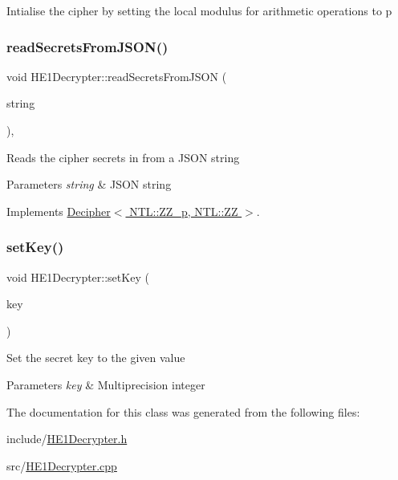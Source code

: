 Intialise the cipher by setting the local modulus for arithmetic operations to {\ttfamily p} \mbox{\label{classHE1Decrypter_af60ccc6d0afe7555a9d1468ad7047733}} 
\subsubsection{\texorpdfstring{read\+Secrets\+From\+J\+S\+O\+N()}{readSecretsFromJSON()}}
{\footnotesize\ttfamily void H\+E1\+Decrypter\+::read\+Secrets\+From\+J\+S\+ON (\begin{DoxyParamCaption}\item[{std\+::string \&}]{string }\end{DoxyParamCaption})\hspace{0.3cm}{\ttfamily [override]}, {\ttfamily [virtual]}}

Reads the cipher secrets in from a J\+S\+ON string 
\begin{DoxyParams}{Parameters}
{\em string} & J\+S\+ON string \\
\hline
\end{DoxyParams}


Implements \hyperlink{classDecipher_a39aea002012130201e12a8fa7d84dda5}{Decipher$<$ N\+T\+L\+::\+Z\+Z\+\_\+p, N\+T\+L\+::\+Z\+Z $>$}.

\mbox{\label{classHE1Decrypter_a7b06b69bcd5ef096067232f819321482}} 
\subsubsection{\texorpdfstring{set\+Key()}{setKey()}}
{\footnotesize\ttfamily void H\+E1\+Decrypter\+::set\+Key (\begin{DoxyParamCaption}\item[{N\+T\+L\+::\+ZZ \&}]{key }\end{DoxyParamCaption})}

Set the secret key to the given value 
\begin{DoxyParams}{Parameters}
{\em key} & Multiprecision integer \\
\hline
\end{DoxyParams}


The documentation for this class was generated from the following files\+:\begin{DoxyCompactItemize}
\item 
include/\hyperlink{HE1Decrypter_8h}{H\+E1\+Decrypter.\+h}\item 
src/\hyperlink{HE1Decrypter_8cpp}{H\+E1\+Decrypter.\+cpp}\end{DoxyCompactItemize}
